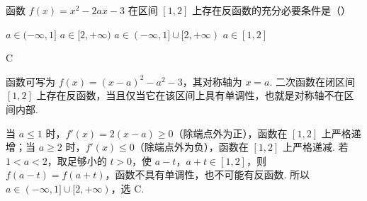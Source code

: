\begin{problem}
函数 \(f(x)=x^{2}-2ax-3\) 在区间 \([1,2]\) 上存在反函数的充分必要条件是（\quad）

\choices
    {\(a\in(-\infty,1]\)}
    {\(a\in[2,+\infty)\)}
    {\(a\in(-\infty,1]\cup[2,+\infty)\)}
    {\(a\in[1,2]\)}
\begin{answer}
C
\end{answer}

\begin{solution}
函数可写为
\(f(x)=(x-a)^{2}-a^{2}-3\)，其对称轴为 \(x=a\). 二次函数在闭区间 \([1,2]\) 上存在反函数，当且仅当它在该区间上具有单调性，也就是对称轴不在区间内部.

当 \(a\leqslant1\) 时，\(f'(x)=2(x-a)\geqslant0\)（除端点外为正），函数在 \([1,2]\) 上严格递增；当 \(a\geqslant2\) 时，\(f'(x)\leqslant0\)（除端点外为负），函数在 \([1,2]\) 上严格递减. 若 \(1<a<2\)，取足够小的 \(t>0\)，使 \(a-t\)，\(a+t\in[1,2]\)，则
\(f(a-t)=f(a+t)\)，函数不具有单调性，也不可能有反函数. 所以
\(a\in(-\infty,1]\cup[2,+\infty)\)，选 C.
\end{solution}

\end{problem}

